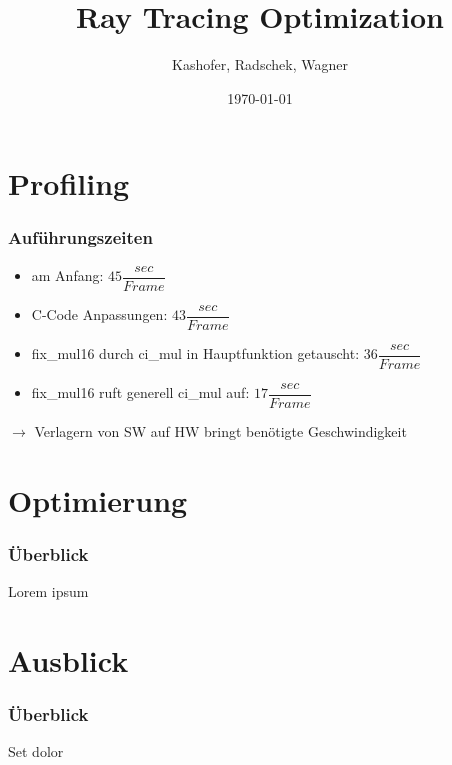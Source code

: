 \documentclass{beamer}
\title{Ray Tracing Optimization}
\author{Kashofer, Radschek, Wagner}
\date{\today}
\begin{document}
\maketitle
\frame{\tableofcontents[currentsection]}
 
\section{Profiling}
\begin{frame} %
	\frametitle{Auführungszeiten} %
  	\begin{itemize}
		\item am Anfang: $45 \dfrac{sec}{Frame}$
		\item C-Code Anpassungen: $43 \dfrac{sec}{Frame}$
		\item fix\_mul16 durch ci\_mul in Hauptfunktion getauscht: $36 \dfrac{sec}{Frame}$
		\item fix\_mul16 ruft generell ci\_mul auf: $17 \dfrac{sec}{Frame}$
	\end{itemize}
	$\quad$\\
	$\rightarrow$ Verlagern von SW auf HW bringt benötigte Geschwindigkeit
\end{frame}

\section{Optimierung}
\begin{frame} %
	\frametitle{Überblick} %
	Lorem ipsum
\end{frame}

\section{Ausblick}
\begin{frame} %
	\frametitle{Überblick} %
	Set dolor
\end{frame}
\end{document}
